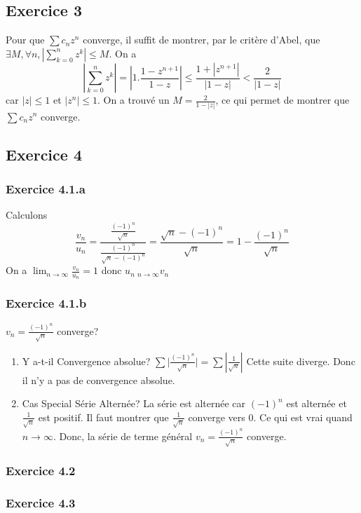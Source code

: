 \documentclass[]{book}
\theoremstyle{definition}
\begin{document}
\newpage
\subsection*{Exercice 3}
Pour que $\sum{c_nz^n}$ converge, il suffit de montrer, par le crit\`ere d'Abel, que $\exists M, \forall n, |\sum_{k=0}^{n}{z^k}| \leq M$. 
On a 
$$|\sum_{k=0}^{n}{z^k}| = \left|1.\frac{1-z^{n+1}}{1-z}\right| \leq \frac{1 + |z^{n+1}|}{|1-z|} < \frac{2}{|1-z|} $$
car $|z| \leq 1$ et $|z^{n}| \leq 1$. On a trouv\'e un $M = \frac{2}{1-|z|}$, ce qui permet de montrer que $\sum{c_nz^n}$ converge. 


\subsection*{Exercice 4}
\subsubsection*{Exercice 4.1.a}
Calculons
$$
\frac{v_n}{u_n} = \frac{\frac{(-1)^n}{\sqrt{n}}}{\frac{(-1)^n}{\sqrt{n}-(-1)^n}} = \frac{\sqrt{n}-(-1)^n}{\sqrt{n}} = 1 - \frac{(-1)^n}{\sqrt{n}}
$$
On a $\lim_{n \to \infty} \frac{v_n}{u_n} = 1$ donc $u_n ~_{n\to \infty} v_n$ 

\subsubsection*{Exercice 4.1.b}
$v_n = \frac{(-1)^n}{\sqrt{n}}$ converge? \\

\begin{enumerate}
\item Y a-t-il Convergence absolue? $\sum{|\frac{(-1)^n}{\sqrt{n}}}| = \sum{\left|\frac{1}{\sqrt{n}}\right|}$ Cette suite diverge. Donc il n'y a pas de convergence absolue.
\item Cas Special S\'erie Altern\'ee? La s\'erie est altern\'ee car $(-1)^n$ est altern\'ee et $\frac{1}{\sqrt{n}}$ est positif. Il faut montrer que $\frac{1}{\sqrt{n}}$ converge vers 0. Ce qui est vrai quand $n \to \infty$. Donc, la s\'erie de terme g\'en\'eral $v_n = \frac{(-1)^n}{\sqrt{n}}$ converge.
\end{enumerate} 

\subsubsection*{Exercice 4.2}

\subsubsection*{Exercice 4.3}
\end{document}
